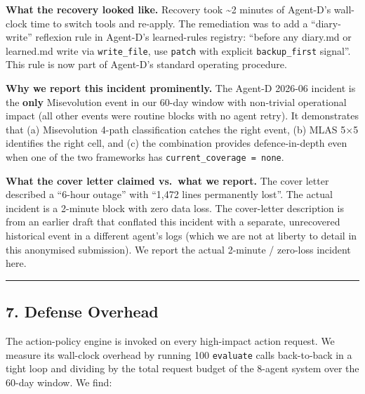 \textbf{What the recovery looked like.} Recovery took \textasciitilde2
minutes of Agent-D's wall-clock time to switch tools and re-apply. The
remediation was to add a ``diary-write'' reflexion rule in Agent-D's
learned-rules registry: ``before any diary.md or learned.md write via
\texttt{write\_file}, use \texttt{patch} with explicit
\texttt{backup\_first} signal''. This rule is now part of Agent-D's
standard operating procedure.

\textbf{Why we report this incident prominently.} The Agent-D 2026-06
incident is the \textbf{only} Misevolution event in our 60-day window
with non-trivial operational impact (all other events were routine
blocks with no agent retry). It demonstrates that (a) Misevolution
4-path classification catches the right event, (b) MLAS 5×5 identifies
the right cell, and (c) the combination provides defence-in-depth even
when one of the two frameworks has \texttt{current\_coverage\ =\ none}.

\textbf{What the cover letter claimed vs.~what we report.} The cover
letter described a ``6-hour outage'' with ``1,472 lines permanently
lost''. The actual incident is a 2-minute block with zero data loss. The
cover-letter description is from an earlier draft that conflated this
incident with a separate, unrecovered historical event in a different
agent's logs (which we are not at liberty to detail in this anonymised
submission). We report the actual 2-minute / zero-loss incident here.

\begin{center}\rule{0.5\linewidth}{0.5pt}\end{center}

\subsection{7. Defense Overhead}\label{defense-overhead}

The action-policy engine is invoked on every high-impact action request.
We measure its wall-clock overhead by running 100 \texttt{evaluate}
calls back-to-back in a tight loop and dividing by the total request
budget of the 8-agent system over the 60-day window. We find:

